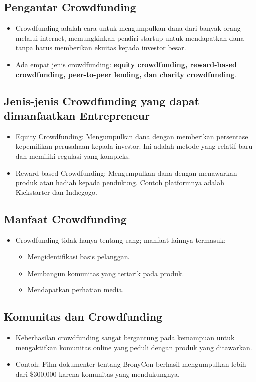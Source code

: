 \documentclass{article}
\begin{document}
\subsection{Pengantar Crowdfunding}
\begin{itemize}
    \item Crowdfunding adalah cara untuk mengumpulkan dana dari banyak orang melalui internet, memungkinkan pendiri startup untuk mendapatkan dana tanpa harus memberikan ekuitas kepada investor besar.
    \item Ada empat jenis crowdfunding: \textbf{equity crowdfunding, reward-based crowdfunding, peer-to-peer lending, dan charity crowdfunding}.
\end{itemize}

\subsection{Jenis-jenis Crowdfunding yang dapat dimanfaatkan Entrepreneur}
\begin{itemize}
    \item Equity Crowdfunding: Mengumpulkan dana dengan memberikan persentase kepemilikan perusahaan kepada investor. Ini adalah metode yang relatif baru dan memiliki regulasi yang kompleks.
    \item Reward-based Crowdfunding: Mengumpulkan dana dengan menawarkan produk atau hadiah kepada pendukung. Contoh platformnya adalah Kickstarter dan Indiegogo.
\end{itemize}

\subsection{Manfaat Crowdfunding}
\begin{itemize}
    \item Crowdfunding tidak hanya tentang uang; manfaat lainnya termasuk:
          \begin{itemize}
              \item Mengidentifikasi basis pelanggan.
              \item Membangun komunitas yang tertarik pada produk.
              \item Mendapatkan perhatian media.
          \end{itemize}
\end{itemize}

\subsection{Komunitas dan Crowdfunding}
\begin{itemize}
    \item Keberhasilan crowdfunding sangat bergantung pada kemampuan untuk mengaktifkan komunitas online yang peduli dengan produk yang ditawarkan.
    \item Contoh: Film dokumenter tentang BronyCon berhasil mengumpulkan lebih dari \$300,000 karena komunitas yang mendukungnya.
\end{itemize}
\end{document}
